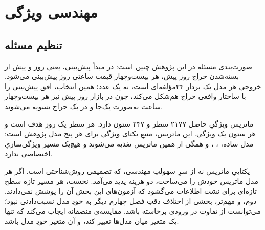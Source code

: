 
\section{مهندسی ویژگی}
\label{sec:3-4}

\subsection*{تنظیم مسئله}

صورت‌بندی مسئله در این پژوهش چنین است: در مبدأ پیش‌بینی، یعنی روز  و پیش از
بسته‌شدن حراج روز-پیش، هر بیست‌وچهار قیمت ساعتی روز  پیش‌بینی می‌شود. خروجی
هر مدل یک بردار ۲۴مؤلفه‌ای است، نه یک عدد؛ همین انتخاب، افق پیش‌بینی را با ساختار
واقعی حراج هم‌شکل می‌کند، چون در بازار روز-پیش نیز هر بیست‌وچهار ساعت به‌صورت
یک‌جا و در یک حراج تسویه می‌شوند.

ماتریس ویژگیِ حاصل ۲۱۷۷ سطر و ۲۴۷ ستون دارد. هر سطر یک روز هدف است و هر ستون یک
ویژگی. این ماتریس، منبعِ یکتای ویژگی برای هر پنج مدل پژوهش است: مدل ساده، ،
،  و  همگی از همین ماتریس تغذیه می‌شوند و هیچ‌یک
مسیر ویژگی‌سازیِ اختصاصی ندارد.

یکتاییِ ماتریس نه از سرِ سهولتِ مهندسی، که تصمیمی روش‌شناختی است. اگر هر مدل ماتریس خودش را
می‌ساخت، دو هزینه پدید می‌آمد. نخست، هر مسیر تازه سطح تازه‌ای برای نشت اطلاعات
می‌گشود که آزمون‌های این بخش آن را پوشش نمی‌دادند. دوم، و مهم‌تر، بخشی از اختلاف
دقتِ فصل چهارم دیگر به خودِ مدل نسبت‌دادنی نبود؛ می‌توانست از تفاوت در ورودی
برخاسته باشد. مقایسه‌ی منصفانه ایجاب می‌کند که تنها یک متغیر میان مدل‌ها تغییر کند، و
آن متغیر خودِ مدل باشد.

